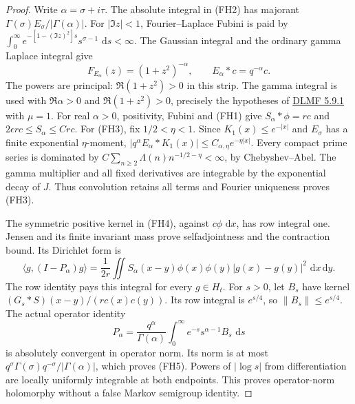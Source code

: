 \documentclass[11pt]{article}
\theoremstyle{remark}\newtheorem{remark}[theorem]{Remark}
\newcommand{\dd}{\,\mathrm d}
\begin{document}
\begin{proof}
Write \(\alpha=\sigma+i\tau\). The absolute integral in (FH2)
has majorant \(\Gamma(\sigma)E_\sigma/|\Gamma(\alpha)|\).
For \(|\Im z|<1\), Fourier--Laplace Fubini is paid by
\(\int_0^\infty e^{-[1-(\Im z)^2]s}s^{\sigma-1}\,\dd s<\infty\).
The Gaussian integral and the ordinary gamma Laplace integral give
\[
 F_{E_\alpha}(z)=(1+z^2)^{-\alpha},\qquad
 E_\alpha*c=q^{-\alpha}c .                              \tag{FH9}
\]
The powers are principal: \(\Re(1+z^2)>0\) in this strip.
The gamma integral is used with \(\Re\alpha>0\) and
\(\Re(1+z^2)>0\), precisely the hypotheses of
\href{https://dlmf.nist.gov/5.9.E1}{DLMF 5.9.1} with \(\mu=1\).
For real \(\alpha>0\), positivity, Fubini and (FH1) give
\(S_\alpha*\phi=rc\) and \(2\epsilon rc\le S_\alpha\le Cr c\).
For (FH3), fix \(1/2<\eta<1\). Since \(K_1(x)\le e^{-|x|}\)
and \(E_\sigma\) has a finite exponential \(\eta\)-moment,
\(|q^\alpha E_\alpha*K_1(x)|\le C_{\alpha,\eta}e^{-\eta|x|}\).
Every compact prime series is dominated by
\(C\sum_{n\ge2}\Lambda(n)n^{-1/2-\eta}<\infty\), by
Chebyshev--Abel. The gamma multiplier and all fixed derivatives
are integrable by the exponential decay of \(J\). Thus convolution
retains all terms and Fourier uniqueness proves (FH3).

The symmetric positive kernel in (FH4), against \(c\phi\,\dd x\),
has row integral one. Jensen and its finite invariant mass prove
selfadjointness and the contraction bound. Its Dirichlet form is
\[
 \langle g,(I-P_\alpha)g\rangle
   =\frac1{2r}\iint S_\alpha(x-y)\phi(x)\phi(y)
                  |g(x)-g(y)|^2\,\dd x\dd y .           \tag{FH10}
\]
The row identity pays this integral for every \(g\in H_t\).
For \(s>0\), let \(B_s\) have kernel
\((G_s*S)(x-y)/(rc(x)c(y))\). Its row integral is \(e^{s/4}\),
so \(\|B_s\|\le e^{s/4}\). The actual operator identity
\[
 P_\alpha=\frac{q^\alpha}{\Gamma(\alpha)}
       \int_0^\infty e^{-s}s^{\alpha-1}B_s\,\dd s          \tag{FH11}
\]
is absolutely convergent in operator norm. Its norm is at most
\(q^\sigma\Gamma(\sigma)q^{-\sigma}/|\Gamma(\alpha)|\),
which proves (FH5). Powers of \(|\log s|\) from differentiation
are locally uniformly integrable at both endpoints. This proves
operator-norm holomorphy without a false Markov semigroup identity.


\end{proof}
\end{document}
